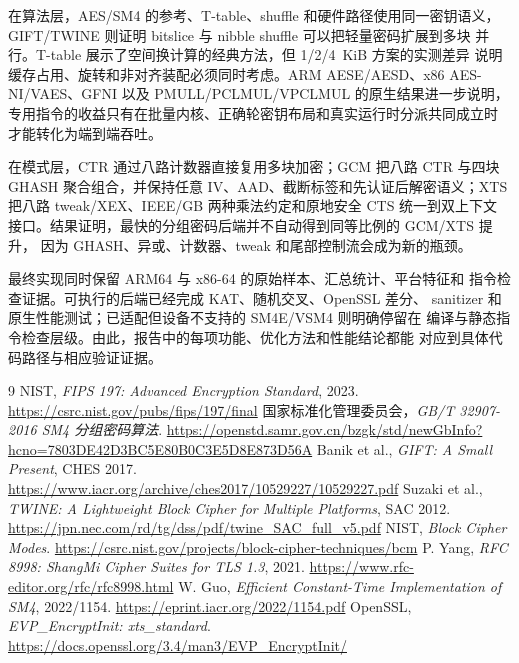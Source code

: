 \documentclass[11pt,a4paper,UTF8,fontset=none]{ctexart}
\begin{document}
在算法层，AES/SM4 的参考、T-table、shuffle 和硬件路径使用同一密钥语义，
GIFT/TWINE 则证明 bitslice 与 nibble shuffle 可以把轻量密码扩展到多块
并行。T-table 展示了空间换计算的经典方法，但 1/2/4~KiB 方案的实测差异
说明缓存占用、旋转和非对齐装配必须同时考虑。ARM AESE/AESD、x86
AES-NI/VAES、GFNI 以及 PMULL/PCLMUL/VPCLMUL 的原生结果进一步说明，
专用指令的收益只有在批量内核、正确轮密钥布局和真实运行时分派共同成立时
才能转化为端到端吞吐。

在模式层，CTR 通过八路计数器直接复用多块加密；GCM 把八路 CTR 与四块
GHASH 聚合组合，并保持任意 IV、AAD、截断标签和先认证后解密语义；XTS
把八路 tweak/XEX、IEEE/GB 两种乘法约定和原地安全 CTS 统一到双上下文
接口。结果证明，最快的分组密码后端并不自动得到同等比例的 GCM/XTS 提升，
因为 GHASH、异或、计数器、tweak 和尾部控制流会成为新的瓶颈。

最终实现同时保留 ARM64 与 x86-64 的原始样本、汇总统计、平台特征和
指令检查证据。可执行的后端已经完成 KAT、随机交叉、OpenSSL 差分、
sanitizer 和原生性能测试；已适配但设备不支持的 SM4E/VSM4 则明确停留在
编译与静态指令检查层级。由此，报告中的每项功能、优化方法和性能结论都能
对应到具体代码路径与相应验证证据。

\clearpage
\begin{thebibliography}{9}\sloppy
{} NIST, \emph{FIPS 197: Advanced Encryption Standard}, 2023.
\url{https://csrc.nist.gov/pubs/fips/197/final}
 国家标准化管理委员会，\emph{GB/T 32907-2016 SM4 分组密码算法}.
\url{https://openstd.samr.gov.cn/bzgk/std/newGbInfo?hcno=7803DE42D3BC5E80B0C3E5D8E873D56A}
 Banik et al., \emph{GIFT: A Small Present}, CHES 2017.
\url{https://www.iacr.org/archive/ches2017/10529227/10529227.pdf}
 Suzaki et al., \emph{TWINE: A Lightweight Block Cipher for Multiple Platforms}, SAC 2012.
\url{https://jpn.nec.com/rd/tg/dss/pdf/twine_SAC_full_v5.pdf}
 NIST, \emph{Block Cipher Modes}.
\url{https://csrc.nist.gov/projects/block-cipher-techniques/bcm}
 P. Yang, \emph{RFC 8998: ShangMi Cipher Suites for TLS 1.3}, 2021.
\url{https://www.rfc-editor.org/rfc/rfc8998.html}
 W. Guo, \emph{Efficient Constant-Time Implementation of SM4}, 2022/1154.
\url{https://eprint.iacr.org/2022/1154.pdf}
 OpenSSL, \emph{EVP\_EncryptInit: xts\_standard}.
\url{https://docs.openssl.org/3.4/man3/EVP_EncryptInit/}
\end{thebibliography}
\end{document}
